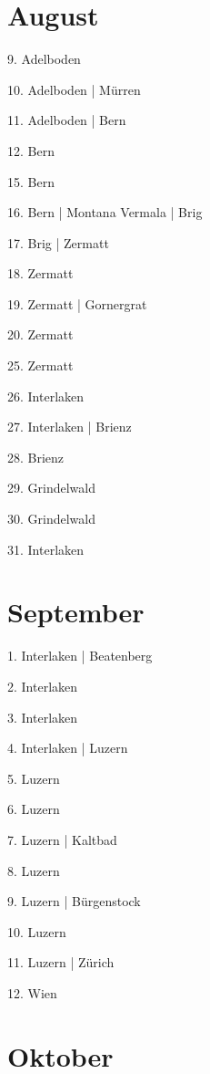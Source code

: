 \documentclass[twoside=false,titlepage=false,open=any, parskip=never, fontsize=10pt, headings=small, chapterprefix=false, appendixprefix=false, DIV=15]{scrbook}
\begin{document}
\begin{multicols}{3}
            \section*{August}
            9. Adelboden\par
            10. Adelboden | Mürren\par
            11. Adelboden | Bern\par
            12. Bern\par
            15. Bern\par
            16. Bern | Montana Vermala | Brig\par
            17. Brig | Zermatt\par
            18. Zermatt\par
            19. Zermatt | Gornergrat\par
            20. Zermatt\par
            25. Zermatt\par
            26. Interlaken\par
            27. Interlaken | Brienz\par
            28. Brienz\par
            29. Grindelwald\par
            30. Grindelwald\par
            31. Interlaken\par
            \section*{September}
            1. Interlaken | Beatenberg\par
            2. Interlaken\par
            3. Interlaken\par
            4. Interlaken | Luzern\par
            5. Luzern\par
            6. Luzern\par
            7. Luzern | Kaltbad\par
            8. Luzern\par
            9. Luzern | Bürgenstock\par
            10. Luzern\par
            11. Luzern | Zürich\par
            12. Wien\par
            \section*{Oktober}

\end{multicols}
\end{document}
